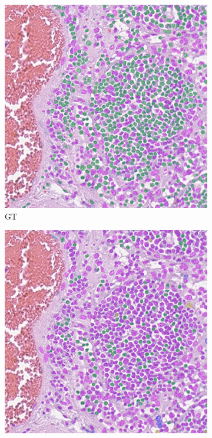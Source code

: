 \begin{figure}[H]
  \centering
  \begin{subfigure}[b]{0.45\textwidth}
    \includegraphics[width=\textwidth]{imgs/qual/consep/gt1.overlay.png}
    \caption{GT}
    \label{fig:consep-gt1}
  \end{subfigure}
  \hfill
  \begin{subfigure}[b]{0.45\textwidth}
    \includegraphics[width=\textwidth]{imgs/qual/consep/hov1.png}

\end{subfigure}
\end{figure}
